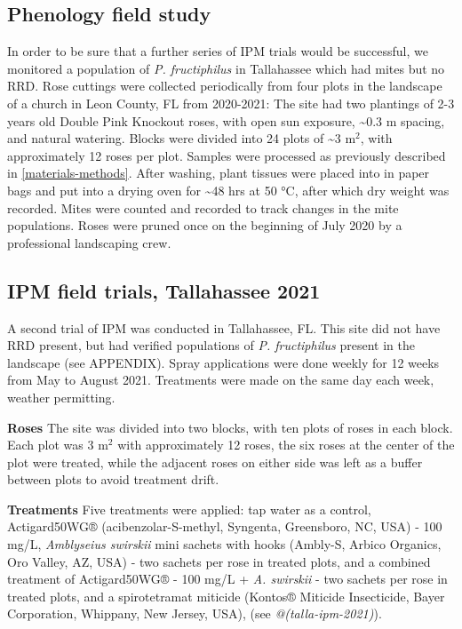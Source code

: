 \documentclass{ufdissertation}[overrideChapters] %
\begin{document}
{\hypertarget{phenology-field-study}{%
\subsection{Phenology field study}\label{phenology-field-study}}

In order to be sure that a further series of IPM trials would be successful, we monitored a population of \emph{P. fructiphilus} in Tallahassee which had mites but no RRD. Rose cuttings were collected periodically from four plots in the landscape of a church in Leon County, FL from 2020-2021: The site had two plantings of 2-3 years old Double Pink Knockout roses, with open sun exposure, \textasciitilde0.3 \si{\metre} spacing, and natural watering. Blocks were divided into 24 plots of \textasciitilde3 \si{\metre}\(^2\), with approximately 12 roses per plot. Samples were processed as previously described in \ref{materials-methods}. After washing, plant tissues were placed into in paper bags and put into a drying oven for \textasciitilde48 hrs at 50 °C, after which dry weight was recorded. Mites were counted and recorded to track changes in the mite populations. Roses were pruned once on the beginning of July 2020 by a professional landscaping crew.

\hypertarget{ipm-field-trials-tallahassee-2021}{%
\subsection{IPM field trials, Tallahassee 2021}\label{ipm-field-trials-tallahassee-2021}}

A second trial of IPM was conducted in Tallahassee, FL. This site did not have RRD present, but had verified populations of \emph{P. fructiphilus} present in the landscape (see APPENDIX). Spray applications were done weekly for 12 weeks from May to August 2021. Treatments were made on the same day each week, weather permitting.

\textbf{Roses}
The site was divided into two blocks, with ten plots of roses in each block. Each plot was 3 \si{m}\(^2\) with approximately 12 roses, the six roses at the center of the plot were treated, while the adjacent roses on either side was left as a buffer between plots to avoid treatment drift.

\textbf{Treatments}
Five treatments were applied: tap water as a control, Actigard50WG® (acibenzolar-S-methyl, Syngenta, Greensboro, NC, USA) - 100 \si{\milli\gram}/\si{\liter}, \emph{Amblyseius swirskii} mini sachets with hooks (Ambly-S, Arbico Organics, Oro Valley, AZ, USA) - two sachets per rose in treated plots, and a combined treatment of Actigard50WG® - 100 \si{\milli\gram}/\si{\liter} + \emph{A. swirskii} - two sachets per rose in treated plots, and a spirotetramat miticide (Kontos® Miticide Insecticide, Bayer Corporation, Whippany, New Jersey, USA), (see \emph{@(talla-ipm-2021)}).

}
\end{document}
